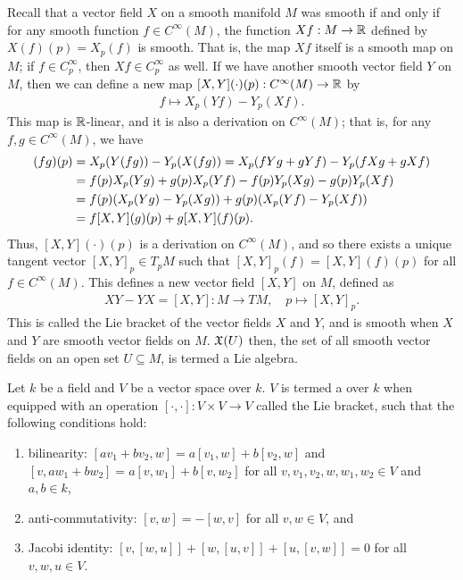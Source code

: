 Recall that a vector field $X$ on a smooth manifold $M$ was smooth if and only if for any smooth function $f \in C^{\infty}(M)$, the function $Xf:M \to \mathbb{R}$ defined by $X(f)(p) = X_{p}(f)$ is smooth. That is, the map $Xf$ itself is a smooth map on $M$; if $f \in C_{p}^{\infty}$, then $Xf \in C_{p}^{\infty}$ as well. If we have another smooth vector field $Y$ on $M$, then we can define a new map $[X,Y](\cdot)(p):C^{\infty}(M) \to \mathbb{R}$ by
\begin{align}
    f \mapsto X_{p}(Yf) - Y_{p}(Xf).
\end{align}
This map is $\mathbb{R}$-linear, and it is also a derivation on $C^{\infty}(M)$; that is, for any $f,g \in C^{\infty}(M)$, we have
\begin{align}
    [X,Y](fg)(p) &= X_{p}(Y(fg)) - Y_{p}(X(fg)) = X_{p}(fYg + gYf) - Y_{p}(fXg + gXf) \notag \\ &= f(p)X_{p}(Yg) + g(p)X_{p}(Yf) - f(p)Y_{p}(Xg) - g(p)Y_{p}(Xf) \notag \\ &= f(p)(X_{p}(Yg) - Y_{p}(Xg)) + g(p)(X_{p}(Yf) - Y_{p}(Xf)) \notag \\ &= f[X,Y](g)(p) + g[X,Y](f)(p).
\end{align}
Thus, $[X,Y](\cdot)(p)$ is a derivation on $C^{\infty}(M)$, and so there exists a unique tangent vector $[X,Y]_{p} \in T_{p}M$ such that $[X,Y]_{p}(f) = [X,Y](f)(p)$ for all $f \in C^{\infty}(M)$. This defines a new vector field $[X,Y]$ on $M$, defined as
\begin{align}
    XY-YX = [X,Y]:M \to TM, \quad p \mapsto [X,Y]_{p}.
\end{align}
This is called the Lie bracket of the vector fields $X$ and $Y$, and is smooth when $X$ and $Y$ are smooth vector fields on $M$. $\mathfrak{X}(U)$ then, the set of all smooth vector fields on an open set $U \subseteq M$, is termed a Lie algebra.

\begin{definition}
    Let $k$ be a field and $V$ be a vector space over $k$. $V$ is termed a  over $k$ when equipped with an operation $[\cdot,\cdot]:V \times V \to V$ called the Lie bracket, such that the following conditions hold:
    \begin{enumerate}
        \item bilinearity: $[av_{1}+bv_{2},w] = a[v_{1},w] + b[v_{2},w]$ and $[v,aw_{1}+bw_{2}] = a[v,w_{1}] + b[v,w_{2}]$ for all $v,v_{1},v_{2},w,w_{1},w_{2} \in V$ and $a,b \in k$,
        \item anti-commutativity: $[v,w] = -[w,v]$ for all $v,w \in V$, and
        \item Jacobi identity: $[v,[w,u]] + [w,[u,v]] + [u,[v,w]] = 0$ for all $v,w,u \in V$.
    \end{enumerate}
\end{definition}

